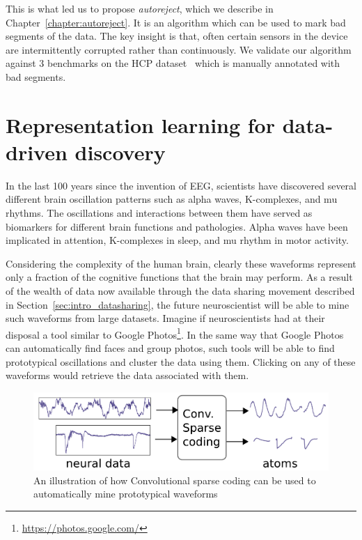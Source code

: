 This is what led us to propose \emph{autoreject}, which we describe in Chapter~\ref{chapter:autoreject}. It is an algorithm which can be used to mark bad segments of the data. The key insight is that, often certain sensors in the device are intermittently corrupted rather than continuously. We validate our algorithm against 3 benchmarks on the \ac{HCP} dataset~\citep{larson2013adding} which is manually annotated with bad segments.

\section{Representation learning for data-driven discovery}
In the last 100 years since the invention of \ac{EEG}, scientists have discovered several different brain oscillation patterns such as alpha waves, K-complexes, and mu rhythms. The oscillations and interactions between them have served as biomarkers for different brain functions and pathologies. Alpha waves have been implicated in attention, K-complexes in sleep, and mu rhythm in motor activity. 

Considering the complexity of the human brain, clearly these waveforms represent only a fraction of the cognitive functions that the brain may perform. As a result of the wealth of data now available through the data sharing movement described in Section~\ref{sec:intro_datasharing}, the future neuroscientist will be able to mine such waveforms from large datasets. Imagine if neuroscientists had at their disposal a tool similar to Google Photos\footnote{\url{https://photos.google.com/}}. In the same way that Google Photos can automatically find faces and group photos, such tools will be able to find prototypical oscillations and cluster the data using them. Clicking on any of these waveforms would retrieve the data associated with them.

\begin{figure}[htb]
\begin{center}
   \includegraphics[width=0.7\linewidth]{figures/schema.pdf}
\end{center}
   \caption[Convolutional sparse coding]{An illustration of how Convolutional sparse coding can be used to automatically mine prototypical waveforms}
   \label{fig:neuroimaging_methods}
\end{figure}

